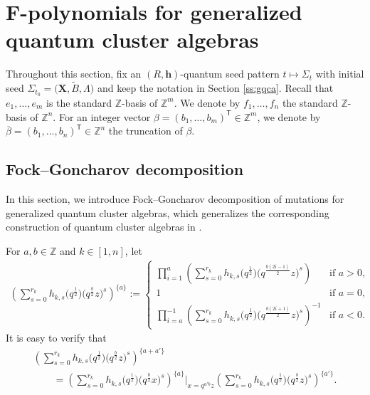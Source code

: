 \documentclass[pdftex]{sigma}
\newcommand{\Z}{\mathbb{Z}}
\numberwithin{equation}{section}
\begin{document}
\section[F-polynomials for generalized quantum cluster algebras]{$\boldsymbol{F}$-polynomials for generalized quantum cluster algebras}

Throughout this section, fix an $(R,\mathbf{h})$-quantum seed pattern $t\mapsto \Sigma_t$ with initial seed $\Sigma_{t_0}=\bigl(\mathbf{X},\tilde{B},\Lambda\bigr)$ and keep the notation in Section \ref{ss:gqca}. Recall that $e_1,\dots, e_m$ is the standard $\mathbb{Z}$-basis of $\mathbb{Z}^m$. We denote by $f_1,\dots, f_n$ the standard $\mathbb{Z}$-basis of $\mathbb{Z}^n$.
For an integer vector $\beta=(b_1,\dots, b_m)^{\mathsf T}\in \Z^m$, we denote by $\overline{\beta}=(b_1,\dots, b_n)^{\mathsf T}\in \Z^n$ the truncation of $\beta$.
\subsection{Fock--Goncharov decomposition}\label{s:FG-decom-GQCA}
In this section, we introduce Fock--Goncharov decomposition of mutations for generalized quantum cluster algebras, which generalizes the corresponding construction of quantum cluster algebras in \cite{fock2009,Keller2012}.


For $a,b\in\mathbb{Z}$ and $k\in[1,n]$, let
\begin{align*}
 \left(\sum\limits^{r_{k}}_{s=0}h_{k,s}\bigl(q^{\frac{1}{2}}\bigr)\bigl(q^{\frac{b}{2}}z\bigr)^{s}\right)^{\{a\}}:=
 \begin{cases}\displaystyle\prod\limits_{i=1}^{a}
 \left(\sum\limits^{r_{k}}_{s=0}h_{k,s}\bigl(q^{\frac{1}{2}}\bigr)\bigl(q^{\frac{b(2i-1)}{2}}z\bigr)^{s}\right)&\text{if } a>0,\\
 1&\text{if }a=0,\\
 \displaystyle \prod\limits_{i=a}^{-1}\left(\sum\limits^{r_{k}}_{s=0}h_{k,s}\bigl(q^{\frac{1}{2}}\bigr)\bigl(q^{\frac{b(2i+1)}{2}}z\bigr)^{s}\right)^{-1}&\text{if } a<0.
 \end{cases}
\end{align*}
It is easy to verify that
\begin{gather}
 \left(\sum\limits^{r_{k}}_{s=0}h_{k,s}\bigl(q^{\frac{1}{2}}\bigr)\bigl(q^{\frac{b}{2}}z\bigr)^{s}\right)^{\{a+a'\}}\nonumber\\
 \qquad=\left(\sum\limits^{r_{k}}_{s=0}h_{k,s}\bigl(q^{\frac{1}{2}}\bigr)\bigl(q^{\frac{b}{2}}x\bigr)^{s}\right)^{\{a\}}\bigg|_{x=q^{a'b}z}
 \left(\sum\limits^{r_{k}}_{s=0}h_{k,s}\bigl(q^{\frac{1}{2}}\bigr)\bigl(q^{\frac{b}{2}}z\bigr)^{s}\right)^{\{a'\}}.\label{eq:FG-decom}
\end{gather}
\end{document}
